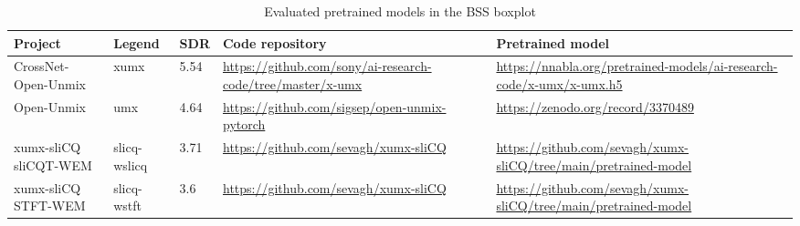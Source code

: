 \documentclass[report.tex]{subfiles}
\begin{document}
\begin{table}[ht]
	\centering
	\caption{Evaluated pretrained models in the BSS boxplot}
	\label{table:bsseval}
	\begin{tabular}{ |p{2.5cm}|l|l|p{4cm}|p{4cm}| }
	 \hline
		Project & Legend & SDR & Code repository & Pretrained model \\
	 \hline
	 \hline
		CrossNet-Open-Unmix & xumx & 5.54 & \url{https://github.com/sony/ai-research-code/tree/master/x-umx} & \url{https://nnabla.org/pretrained-models/ai-research-code/x-umx/x-umx.h5} \\
	 \hline
		Open-Unmix & umx & 4.64 & \url{https://github.com/sigsep/open-unmix-pytorch} & \url{https://zenodo.org/record/3370489} \\
	 \hline
		\makecell[l]{xumx-sliCQ \\ sliCQT-WEM} & slicq-wslicq & 3.71 & \url{https://github.com/sevagh/xumx-sliCQ} & \url{https://github.com/sevagh/xumx-sliCQ/tree/main/pretrained-model} \\
	 \hline
		\makecell[l]{xumx-sliCQ \\ STFT-WEM} & slicq-wstft & 3.6 & \url{https://github.com/sevagh/xumx-sliCQ} & \url{https://github.com/sevagh/xumx-sliCQ/tree/main/pretrained-model} \\
	 \hline
\end{tabular}
\end{table}
\end{document}
